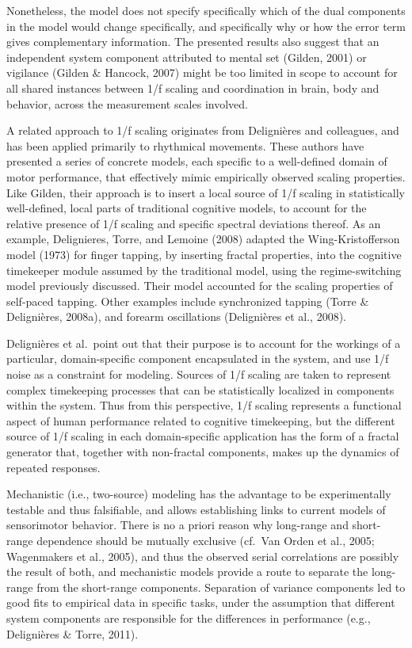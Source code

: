 \documentclass[12pt,]{book}
\begin{document}
Nonetheless, the model does not specify specifically which of the dual components in the model would change specifically, and specifically why or how the error term gives complementary information. The presented results also suggest that an independent system component attributed to mental set (Gilden, 2001) or vigilance (Gilden \& Hancock, 2007) might be too limited in scope to account for all shared instances between 1/f scaling and coordination in brain, body and behavior, across the measurement scales involved.

A related approach to 1/f scaling originates from Delignières and colleagues, and has been applied primarily to rhythmical movements. These authors have presented a series of concrete models, each specific to a well-defined domain of motor performance, that effectively mimic empirically observed scaling properties. Like Gilden, their approach is to insert a local source of 1/f scaling in statistically well-defined, local parts of traditional cognitive models, to account for the relative presence of 1/f scaling and specific spectral deviations thereof. As an example, Delignieres, Torre, and Lemoine (2008) adapted the Wing-Kristofferson model (1973) for finger tapping, by inserting fractal properties, into the cognitive timekeeper module assumed by the traditional model, using the regime-switching model previously discussed. Their model accounted for the scaling properties of self-paced tapping. Other examples include synchronized tapping (Torre \& Delignières, 2008a), and forearm oscillations (Delignières et al., 2008).

Delignières et al.~point out that their purpose is to account for the workings of a particular, domain-specific component encapsulated in the system, and use 1/f noise as a constraint for modeling. Sources of 1/f scaling are taken to represent complex timekeeping processes that can be statistically localized in components within the system. Thus from this perspective, 1/f scaling represents a functional aspect of human performance related to cognitive timekeeping, but the different source of 1/f scaling in each domain-specific application has the form of a fractal generator that, together with non-fractal components, makes up the dynamics of repeated responses.

Mechanistic (i.e., two-source) modeling has the advantage to be experimentally testable and thus falsifiable, and allows establishing links to current models of sensorimotor behavior. There is no a priori reason why long-range and short-range dependence should be mutually exclusive (cf.~Van Orden et al., 2005; Wagenmakers et al., 2005), and thus the observed serial correlations are possibly the result of both, and mechanistic models provide a route to separate the long-range from the short-range components. Separation of variance components led to good fits to empirical data in specific tasks, under the assumption that different system components are responsible for the differences in performance (e.g., Delignières \& Torre, 2011).
\end{document}
